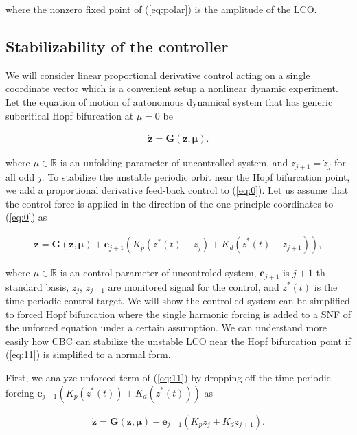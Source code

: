 \documentclass[openacc]{rsproca_new}%
\def\real{\mathbb{R}}
\def\vec#1{\ensuremath{\mathbf{#1}}}
\newcommand{\Eref}[1]{(\ref{#1})}
\begin{document}
\noindent where the nonzero fixed point of \Eref{eq:polar} is the amplitude of the LCO.

\subsection{Stabilizability of the controller}

We will consider linear proportional derivative control acting on a single coordinate vector which is a convenient setup a nonlinear dynamic experiment. Let the equation of motion of autonomous dynamical system that has  generic subcritical Hopf bifurcation at $\mu=0$ be

\begin{align}\label{eq:0}
    \dot{\vec{z}} =\vec{G}(\vec{z},\vec{\mu}).
\end{align}

\noindent where $\mu\in \real$ is an unfolding parameter of uncontrolled system, and $z_{j+1}=\dot z_j$ for all odd $j$. To stabilize the unstable periodic orbit near the Hopf bifurcation point, we add a proportional derivative feed-back control to \Eref{eq:0}. Let us assume that the control force is applied in the direction of the one principle coordinates to \Eref{eq:0} as

\begin{align}\label{eq:11}
    \dot{\vec{z}} =\vec{G}(\vec{z},\vec{\mu})+\vec{e}_{j+1}(K_p(z^*(t)-z_j)+K_d(\dot z^*(t)-z_{j+1})),
\end{align}

\noindent where $\mu\in \real$ is an control parameter of uncontroled system, $\vec{e}_{j+1}$ is $j+1$ th standard basis, $z_{j}$, $z_{j+1}$ are monitored signal for the control, and $z^*(t)$  is the time-periodic control target. We will show the controlled system can be simplified to forced Hopf bifurcation where the single harmonic forcing is added to a SNF of the unforced equation under a certain assumption. We can understand more easily how CBC can stabilize the unstable LCO near the Hopf bifurcation point if \Eref{eq:11} is simplified to a normal form.

First, we analyze unforced term of \Eref{eq:11} by dropping off the time-periodic forcing $\vec{e}_{j+1}(K_p(z^*(t))+K_d(\dot z^*(t)))$ as

\begin{align}\label{eq:12}
    \dot{\vec{z}} =\vec{G}(\vec{z},\vec{\mu})-\vec{e}_{j+1}(K_p z_j+K_d z_{j+1}).
\end{align}
\end{document}

